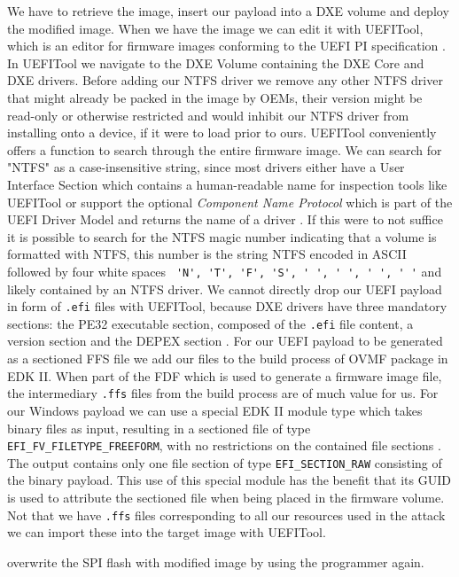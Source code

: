 We have to retrieve the image, insert our payload into a \ac{DXE} volume and deploy the modified image.
When we have the image we can edit it with UEFITool, which is an editor for firmware images conforming to the \ac{UEFI} \ac{PI} specification \cite{uefitool}.
In UEFITool we navigate to the \ac{DXE} Volume containing the \ac{DXE} Core and \ac{DXE} drivers.
Before adding our \ac{NTFS} driver we remove any other \ac{NTFS} driver that might already be packed in the image by \acp{OEM}, their version might be read-only or otherwise restricted and would inhibit our \ac{NTFS} driver from installing onto a device, if it were to load prior to ours.
UEFITool conveniently offers a function to search through the entire firmware image.
We can search for "NTFS" as a case-insensitive string, since most drivers either have a User Interface Section which contains a human-readable name for inspection tools like UEFITool \cite[Vol 3, 3.2.5]{pi-spec} or support the optional \emph{Component Name Protocol} which is part of the \ac{UEFI} Driver Model and returns the name of a driver \cite[11.5]{uefi-spec}.
If this were to not suffice it is possible to search for the \ac{NTFS} magic number indicating that a volume is formatted with \ac{NTFS}, this number is the string \ac{NTFS} encoded in \ac{ASCII} followed by four white spaces \lstinline{ 'N', 'T', 'F', 'S', ' ', ' ', ' ', ' '} and likely contained by an \ac{NTFS} driver.
We cannot directly drop our \ac{UEFI} payload in form of \lstinline{.efi} files with UEFITool, because \ac{DXE} drivers have three mandatory sections: the \ac{PE32} executable section, composed of the \lstinline{.efi} file content, a version section and the \ac{DEPEX} section \cite[Vol 3, 2.1.4.1.4]{pi-spec}.
For our \ac{UEFI} payload to be generated as a sectioned \ac{FFS} file we add our files to the build process of \ac{OVMF} package in \ac{EDK} II. When part of the \ac{FDF} which is used to generate a firmware image file, the intermediary \lstinline{.ffs} files from the build process are of much value for us.
For our Windows payload we can use a special \ac{EDK} II module type which takes binary files as input, resulting in a sectioned file of type \lstinline{EFI_FV_FILETYPE_FREEFORM}, with no restrictions on the contained file sections \cite[Vol 3, 2.1.4.1.7]{pi-spec}.
The output contains only one file section of type \lstinline{EFI_SECTION_RAW} consisting of the binary payload.
This use of this special module has the benefit that its \ac{GUID} is used to attribute the sectioned file when being placed in the firmware volume.
Not that we have \lstinline{.ffs} files corresponding to all our resources used in the attack we can import these into the target image with UEFITool.

overwrite the SPI flash with modified image by using the programmer again.
